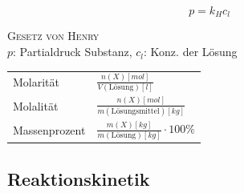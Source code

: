 \documentclass[12pt,a4paper]{article}
\renewcommand{\=}[1]{\stackrel{#1}{=}}
\theoremstyle{definition}
\theoremstyle{remark}
\begin{document}
\begin{center}
\begin{minipage}[t]{.45\linewidth}
\vspace{0pt}

\begin{framed}
$$p = k_H c_l$$
\begin{center}
\textsc{Gesetz von Henry}\\
{\scriptsize $p$: Partialdruck Substanz, $c_l$: Konz. der Lösung}
\end{center}
\end{framed}

\end{minipage}%
\hspace{0.02\linewidth}
\begin{minipage}[t]{.45\linewidth}
\vspace{0pt}

\begin{tabular}{l|l}
Molarität & $\frac{n(X)[mol]}{V(\text{Lösung})[l]}$\\[11pt]
Molalität & $\frac{n(X)[mol]}{m(\text{Lösungsmittel})[kg]}$\\[11pt]
Massenprozent & $\frac{m(X)[kg]}{m(\text{Lösung})[kg]} \cdot 100\%$
\end{tabular}

\end{minipage}
\end{center}

\subsection{Reaktionskinetik}
\end{document}

